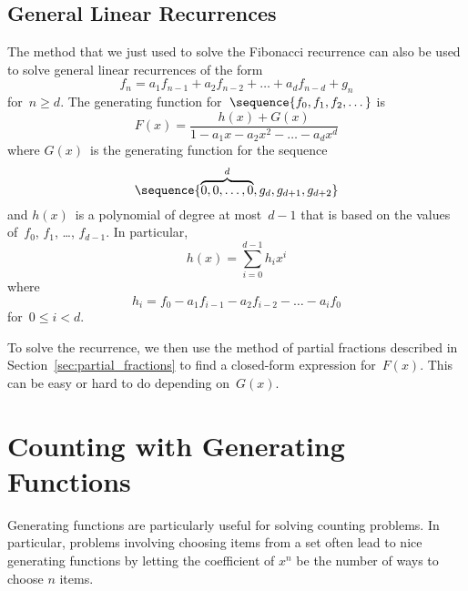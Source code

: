 \subsection{General Linear Recurrences}

The method that we just used to solve the Fibonacci recurrence can
also be used to solve general linear recurrences of the form
\begin{equation*}
    f_n = a_1 f_{n - 1} + a_2 f_{n - 2} + \dots + a_d f_{n - d} + g_n
\end{equation*}
for~$n \ge d$.  The generating function for~$\sequence{f_0, f_1, f_2,
  \dots}$ is
\begin{equation*}
F(x) = \frac{ h(x) + G(x) }{ 1 - a_1 x - a_2 x^2 - \dots - a_d x^d }
\end{equation*}
where $G(x)$~is the generating function for the sequence
\begin{equation*}
    \sequence{ \overbrace{0, 0, \dots, 0}^d, g_d, g_{d + 1}, g_{d + 2} }
\end{equation*}
and $h(x)$~is a polynomial of degree at most~$d - 1$ that is based on
the values of~$f_0$, $f_1$, \dots, $f_{d - 1}$.  In particular,
\begin{equation*}
    h(x) = \sum_{i = 0}^{d - 1} h_i x^i
\end{equation*}
where
\begin{equation*}
    h_i = f_0 - a_1 f_{i - 1} - a_2 f_{i - 2} - \dots - a_i f_0
\end{equation*}
for~$0 \le i < d$.

To solve the recurrence, we then use the method of partial fractions
described in Section~\ref{sec:partial_fractions} to find a closed-form
expression for~$F(x)$.  This can be easy or hard to do depending
on~$G(x)$.

\begin{problems}
\classproblems
{}

\homeworkproblems
{}

\end{problems}

\section{Counting with Generating Functions}

Generating functions are particularly useful for solving counting
problems.  In particular, problems involving choosing items from a set
often lead to nice generating functions by letting the coefficient of
$x^n$ be the number of ways to choose $n$ items.


